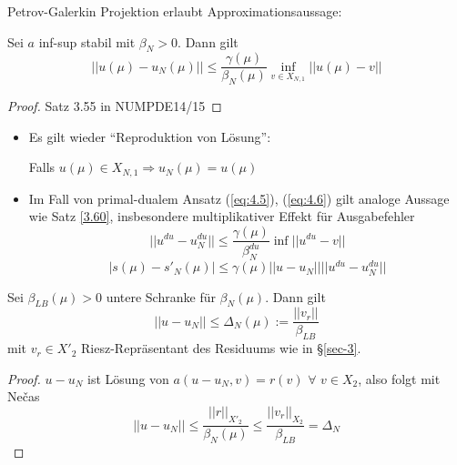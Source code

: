 Petrov-Galerkin Projektion erlaubt Approximationsaussage:

\begin{satz}
Sei $a$ inf-sup stabil mit $\beta_N > 0$. Dann gilt
\[
	||u(\mu) - u_N(\mu)|| \leq \frac{\gamma(\mu)}{\beta_N(\mu)} \inf\limits_{v \in X_{N,1}} ||u(\mu) - v||
\]
\begin{proof}
Satz 3.55 in NUMPDE14/15
\end{proof}
\end{satz}

\begin{bem} \beginwithlistbem
	\begin{itemize}
		\item Es gilt wieder ``Reproduktion von Lösung'':
		
		Falls $u(\mu) \in X_{N,1} \Rightarrow u_N(\mu) = u(\mu)$
		\item Im Fall von primal-dualem Ansatz (\ref{eq:4.5}), (\ref{eq:4.6}) gilt analoge Aussage wie Satz \ref{3.60}, insbesondere multiplikativer Effekt für Ausgabefehler
		\[
			||u^{du} - u_N^{du}|| \leq \frac{\gamma(\mu)}{\beta_N^{du}} \inf ||u^{du} - v||
		\]
		\[
			| s(\mu) - s'_N(\mu)| \leq \gamma(\mu) ||u-u_N|| ||u^{du} - u_N^{du}||
		\]
	\end{itemize}
\end{bem}

\begin{satz}
Sei $\beta_{LB}(\mu) > 0$ untere Schranke für $\beta_N(\mu)$. Dann gilt
\[
	||u - u_N|| \leq \Delta_N (\mu) := \frac{||v_r||}{\beta_{LB}}
\]
mit $v_r \in X'_2$ Riesz-Repräsentant des Residuums wie in §\ref{sec-3}.
\begin{proof}
$u-u_N$ ist Lösung von $a(u-u_N,v) = r(v) \,\, \forall \,\, v \in X_2$, also folgt mit Ne\v{c}as
\[
	||u-u_N|| \leq \frac{||r||_{X'_2}}{\beta_N(\mu)} \leq \frac{||v_r||_{X_2}}{\beta_{LB}} = \Delta_N
\]
\end{proof}
\end{satz}

